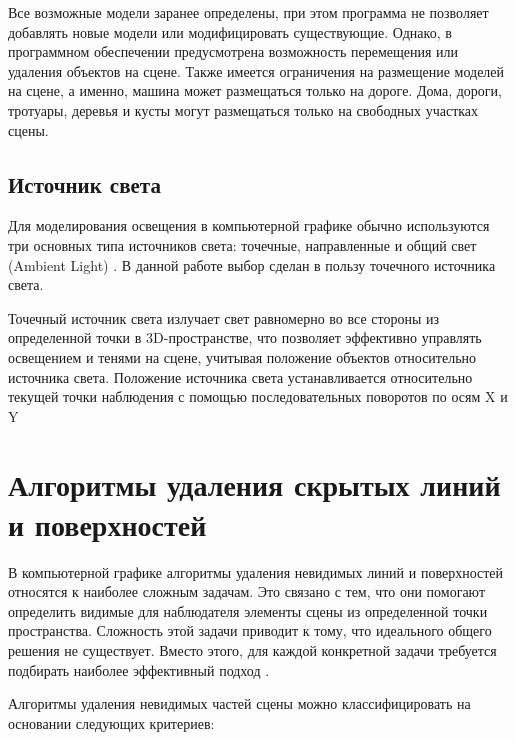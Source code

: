 Все возможные модели заранее определены, при этом программа не позволяет добавлять новые модели или модифицировать существующие. Однако, в программном обеспечении предусмотрена возможность перемещения или удаления объектов на сцене. Также имеется ограничения на размещение моделей на сцене, а именно, машина может размещаться только на дороге. Дома, дороги, тротуары, деревья и кусты могут размещаться только на свободных участках сцены.


\subsection{Источник света}

Для моделирования освещения в компьютерной графике обычно используются три основных типа источников света: точечные, направленные и общий свет (Ambient Light) \cite{light}. В данной работе выбор сделан в пользу точечного источника света.

Точечный источник света излучает свет равномерно во все стороны из определенной точки в 3D-пространстве, что позволяет эффективно управлять освещением и тенями на сцене, учитывая положение объектов относительно источника света. Положение источника света устанавливается относительно текущей точки наблюдения с помощью последовательных поворотов по осям X и Y \cite{light}

\section{Алгоритмы удаления скрытых линий и поверхностей}

В компьютерной графике алгоритмы удаления невидимых линий и поверхностей относятся к наиболее сложным задачам. Это связано с тем, что они помогают определить видимые для наблюдателя элементы сцены из определенной точки пространства. Сложность этой задачи приводит к тому, что идеального общего решения не существует. Вместо этого, для каждой конкретной задачи требуется подбирать наиболее эффективный подход \cite{del_line}.


Алгоритмы удаления невидимых частей сцены можно классифицировать на основании следующих критериев:

